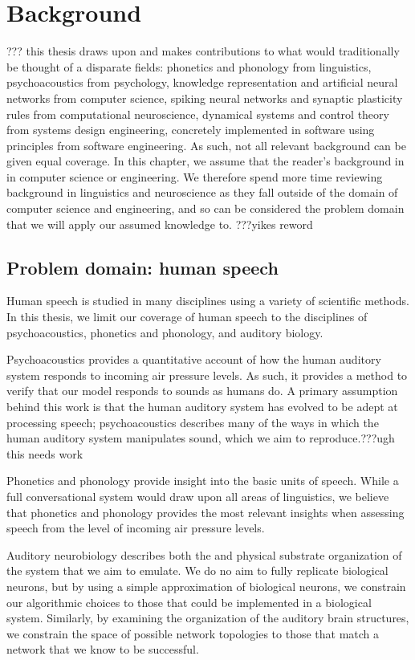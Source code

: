 \chapter{Background}

??? this thesis draws upon and makes contributions
to what would traditionally be thought of a disparate fields:
phonetics and phonology from linguistics,
psychoacoustics from psychology,
knowledge representation
and artificial neural networks from computer science,
spiking neural networks and
synaptic plasticity rules from computational neuroscience,
dynamical systems and control theory
from systems design engineering,
concretely implemented in software
using principles from software engineering.
As such, not all relevant background can
be given equal coverage.
In this chapter, we assume
that the reader's background
in in computer science or engineering.
We therefore spend more time
reviewing background in linguistics
and neuroscience as they fall outside
of the domain of computer science and engineering,
and so can be considered the problem domain
that we will apply our assumed knowledge to.
???yikes reword

\section{Problem domain: human speech}

Human speech is studied in many disciplines
using a variety of scientific methods.
In this thesis, we limit our coverage of human speech
to the disciplines of psychoacoustics,
phonetics and phonology,
and auditory biology.

Psychoacoustics provides a quantitative account
of how the human auditory system
responds to incoming air pressure levels.
As such, it provides a method to verify
that our model responds to sounds
as humans do.
A primary assumption behind this work
is that the human auditory system
has evolved to be adept at processing speech;
psychoacoustics describes many of the ways
in which the human auditory system
manipulates sound,
which we aim to reproduce.???ugh this needs work

Phonetics and phonology
provide insight into the basic units of speech.
While a full conversational system
would draw upon all areas of linguistics,
we believe that phonetics and phonology
provides the most relevant insights
when assessing speech from the level of
incoming air pressure levels.

Auditory neurobiology describes both
the and physical substrate organization
of the system that we aim to emulate.
We do no aim to fully replicate
biological neurons,
but by using a simple approximation
of biological neurons,
we constrain our algorithmic choices
to those that could be implemented
in a biological system.
Similarly, by examining the organization
of the auditory brain structures,
we constrain the space of possible
network topologies
to those that match
a network that we know to be successful.

